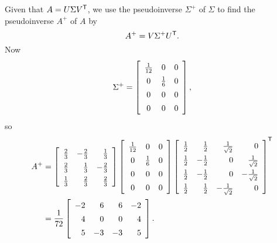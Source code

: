 \begin{example}
\item Given that $A = U \Sigma V^{\mathsf{T}}$, we use the pseudoinverse $\Sigma^+$ of $\Sigma$ to find the pseudoinverse $A^+$ of $A$ by
\[A^+ = V \Sigma^+ U^{\mathsf{T}}.\]
Now
\[\Sigma^+ = \left[ \renewcommand{\arraystretch}{1.4} \begin{array}{ccc} \frac{1}{12}&0&0 \\ 0&\frac{1}{6}&0 \\0&0&0 \\ 0&0&0 \end{array} \right],\]
so
\begin{align*}
A^+ &= \left[ \renewcommand{\arraystretch}{1.4} \begin {array}{crr} \frac{2}{3}&-\frac{2}{3}&\frac{1}{3}\\ \frac{2}{3}&\frac{1}{3}&-
\frac{2}{3}\\  \frac{1}{3}&\frac{2}{3}&\frac{2}{3}\end {array} \right] \left[ \renewcommand{\arraystretch}{1.4} \begin{array}{ccc} \frac{1}{12}&0&0 \\ 0&\frac{1}{6}&0 \\0&0&0 \\ 0&0&0 \end{array} \right] \left[ \renewcommand{\arraystretch}{1.4} \begin{array}{crrr} \frac{1}{2} & \frac{1}{2} & \frac{1}{\sqrt{2}} & 0 \\ \frac{1}{2} & -\frac{1}{2} & 0 & \frac{1}{\sqrt{2}} \\  \frac{1}{2} & -\frac{1}{2} & 0 & -\frac{1}{\sqrt{2}} \\ \frac{1}{2} & \frac{1}{2} & -\frac{1}{\sqrt{2}} & 0 \\\end{array} \right]^{\tr} \\
	&=  \frac{1}{72} \left[ \begin{array}{rrrr} -2&6&6&-2 \\ 4&0&0&4 \\ 5&-3&-3&5 \end {array} \right].
\end{align*}


\end{example}
